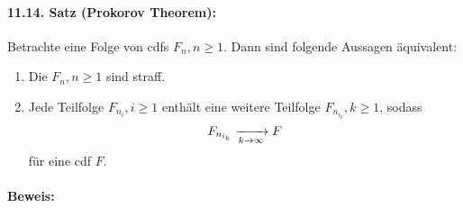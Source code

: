 \documentclass[11pt]{report}
\begin{document}
\paragraph{11.14. Satz (Prokorov Theorem):} Betrachte eine Folge von cdfs $F_n,n\geq1$. Dann sind folgende Aussagen \"aquivalent:
\begin{enumerate}[label=(\roman*)]
    \item Die $F_n,n\geq1$ sind straff.
    \item Jede Teilfolge $F_{n_i},i\geq1$ enth\"alt eine weitere Teilfolge $F_{n_{i_k}},k\geq1$, sodass 
        $$F_{n_{i_k}}\nto{}{k\to\infty}F$$
        f\"ur eine cdf $F$.
\end{enumerate}

\paragraph{Beweis:}
\end{document}
